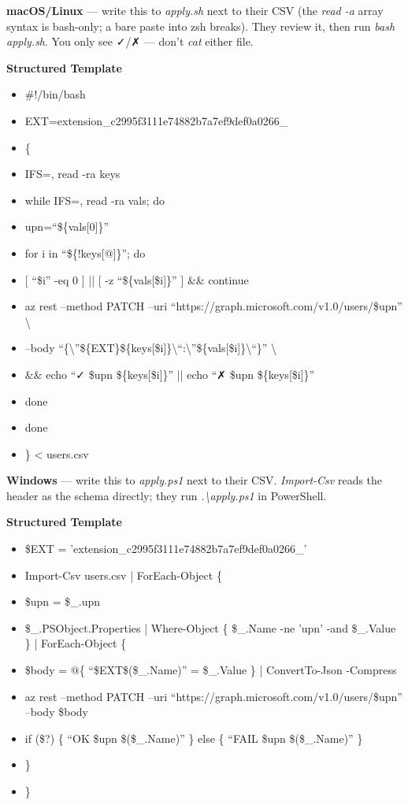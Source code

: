 \documentclass[11pt]{article}
\begin{document}
\textbf{macOS/Linux} — write this to \emph{apply.sh} next to their CSV (the \emph{read -a} array syntax is bash-only; a bare paste into zsh breaks). They review it, then run \emph{bash apply.sh}. You only see ✓/✗ — don't \emph{cat} either file.


\textbf{Structured Template}
\begin{itemize}[leftmargin=*,itemsep=2pt,topsep=2pt]
\item {} \#!/bin/bash
\item {} EXT=extension\_\allowbreak{}c2995f3111e74882b7a7ef9def0a0266\_\allowbreak{}
\item {} \{
\item {} IFS=, read -ra keys
\item {} while IFS=, read -ra vals; do
\item {} upn=``\$\{vals[0]\}''
\item {} for i in ``\$\{!keys[@]\}''; do
\item {} [ ``\$i'' -eq 0 ] || [ -z ``\$\{vals[\$i]\}'' ] \&\& continue
\item {} az rest --method PATCH --uri ``https://graph.microsoft.com/v1.0/users/\$upn'' \textbackslash{}
\item {} --body ``\{\textbackslash{}''\$\{EXT\}\$\{keys[\$i]\}\textbackslash{}``:\textbackslash{}''\$\{vals[\$i]\}\textbackslash{}``\}'' \textbackslash{}
\item {} \&\& echo ``✓ \$upn \$\{keys[\$i]\}'' || echo ``✗ \$upn \$\{keys[\$i]\}''
\item {} done
\item {} done
\item {} \} < users.csv
\end{itemize}

\textbf{Windows} — write this to \emph{apply.ps1} next to their CSV. \emph{Import-Csv} reads the header as the schema directly; they run \emph{.\textbackslash{}apply.ps1} in PowerShell.


\textbf{Structured Template}
\begin{itemize}[leftmargin=*,itemsep=2pt,topsep=2pt]
\item {} \$EXT = 'extension\_\allowbreak{}c2995f3111e74882b7a7ef9def0a0266\_\allowbreak{}'
\item {} Import-Csv users.csv | ForEach-Object \{
\item {} \$upn = \$\_\allowbreak{}.upn
\item {} \$\_\allowbreak{}.PSObject.Properties | Where-Object \{ \$\_\allowbreak{}.Name -ne 'upn' -and \$\_\allowbreak{}.Value \} | ForEach-Object \{
\item {} \$body = @\{ ``\$EXT\$(\$\_\allowbreak{}.Name)'' = \$\_\allowbreak{}.Value \} | ConvertTo-Json -Compress
\item {} az rest --method PATCH --uri ``https://graph.microsoft.com/v1.0/users/\$upn'' --body \$body
\item {} if (\$?) \{ ``OK \$upn \$(\$\_\allowbreak{}.Name)'' \} else \{ ``FAIL \$upn \$(\$\_\allowbreak{}.Name)'' \}
\item {} \}
\item {} \}
\end{itemize}
\end{document}
